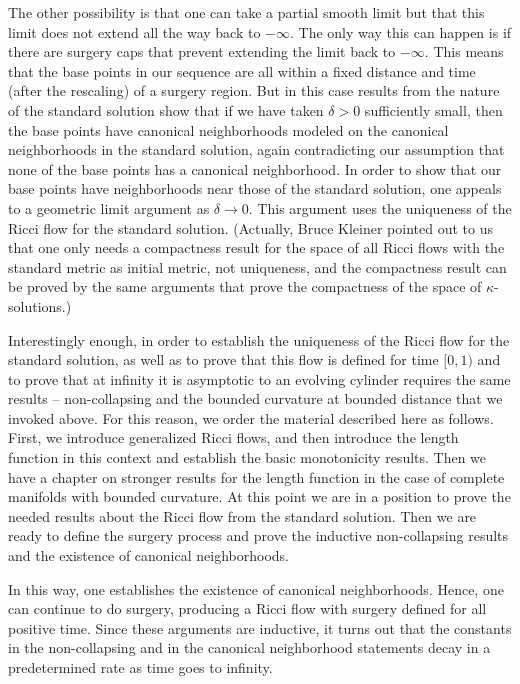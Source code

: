 The other possibility is that one can take a partial smooth limit
but that this limit does not extend all the way back to $-\infty$.
The only way this can happen is if there are surgery caps that
prevent extending the limit back to $-\infty$. This means that the
base points in our sequence are all within a fixed distance and time
(after the rescaling) of a surgery region. But in this case results
from the nature of the standard solution show that if we have taken
$\delta>0$ sufficiently small, then the base points have canonical
neighborhoods modeled on the canonical neighborhoods in the standard
solution, again contradicting our assumption that none of the base
points has a canonical neighborhood. In order to show that our base
points have neighborhoods near those of the standard solution, one
appeals to a geometric limit argument as $\delta\rightarrow 0$. This
argument uses the uniqueness of the Ricci flow for the standard
solution. (Actually, Bruce Kleiner pointed out to us that one only
needs a compactness result for the space of all Ricci flows with the
standard metric as initial metric, not uniqueness, and the
compactness result can be proved by the same arguments that prove
the compactness of the space of $\kappa$-solutions.)



Interestingly enough, in order to establish the uniqueness of the
Ricci flow for the standard solution, as well as to prove that this
flow is defined for time $[0,1)$ and to prove that at infinity it is
asymptotic to an evolving cylinder requires the same results --
non-collapsing and the bounded curvature at bounded distance that we
invoked above. For this reason, we order the material described here
as follows. First, we introduce  generalized Ricci flows, and then
introduce the length function in this context and establish the
basic monotonicity results. Then we have a chapter on stronger
results for the length function in the case of complete manifolds
with bounded curvature. At this point we are in a position to prove
the needed results about the Ricci flow from the standard solution.
Then we are ready to define the surgery process and prove the
inductive non-collapsing results and the existence of canonical
neighborhoods.



In this way, one establishes the existence of canonical neighborhoods. Hence,
one can continue to do surgery, producing a Ricci flow with surgery defined for
all positive time.  Since these arguments are inductive, it turns out that the
constants in the non-collapsing and in the canonical neighborhood statements
decay in a predetermined rate as time goes to infinity.


